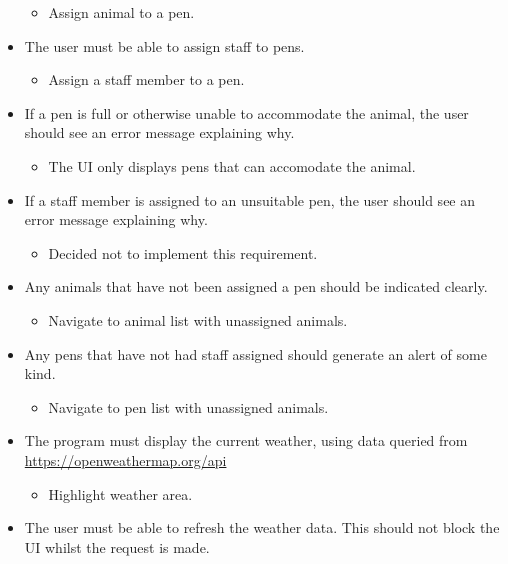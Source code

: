 \documentclass[english,a4paper,]{report}
\providecommand{\tightlist}{%
  \setlength{\itemsep}{0pt}\setlength{\parskip}{0pt}}
\begin{document}
\begin{itemize}
  \begin{itemize}
  \tightlist
  \item
    Assign animal to a pen.
  \end{itemize}
\item
  The user must be able to assign staff to pens.

  \begin{itemize}
  \tightlist
  \item
    Assign a staff member to a pen.
  \end{itemize}
\item
  If a pen is full or otherwise unable to accommodate the animal, the
  user should see an error message explaining why.

  \begin{itemize}
  \tightlist
  \item
    The UI only displays pens that can accomodate the animal.
  \end{itemize}
\item
  If a staff member is assigned to an unsuitable pen, the user should
  see an error message explaining why.

  \begin{itemize}
  \tightlist
  \item
    Decided not to implement this requirement.
  \end{itemize}
\item
  Any animals that have not been assigned a pen should be indicated
  clearly.

  \begin{itemize}
  \tightlist
  \item
    Navigate to animal list with unassigned animals.
  \end{itemize}
\item
  Any pens that have not had staff assigned should generate an alert of
  some kind.

  \begin{itemize}
  \tightlist
  \item
    Navigate to pen list with unassigned animals.
  \end{itemize}
\item
  The program must display the current weather, using data queried from
  \url{https://openweathermap.org/api}

  \begin{itemize}
  \tightlist
  \item
    Highlight weather area.
  \end{itemize}
\item
  The user must be able to refresh the weather data. This should not
  block the UI whilst the request is made.


\end{itemize}
\end{document}
